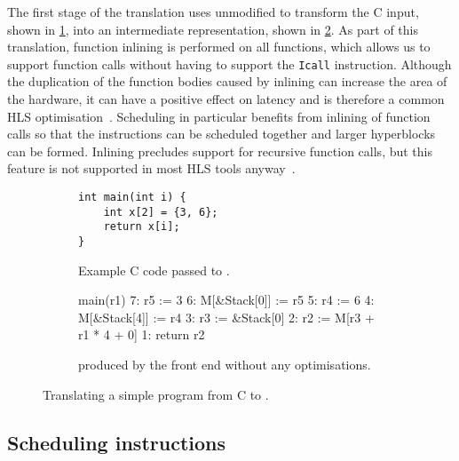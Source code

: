 The first stage of the translation uses unmodified \compcert{} to transform the
C input, shown in \cref{fig:accumulator_c}, into an \rtl{} intermediate
representation, shown in \cref{fig:accumulator_rtl}.  As part of this
translation, function inlining is performed on all functions, which allows us to
support function calls without having to support the \texttt{Icall} \rtl{}
instruction.  Although the duplication of the function bodies caused by inlining
can increase the area of the hardware, it can have a positive effect on latency
and is therefore a common HLS optimisation~\cite{noronha17_rapid_fpga}.
Scheduling in particular benefits from inlining of function calls so that the
instructions can be scheduled together and larger hyperblocks can be formed.
Inlining precludes support for recursive function calls, but this feature is not
supported in most HLS tools anyway~\cite{thomas16_srcht}.

\begin{figure}
  \centering
    \begin{subfigure}[b]{0.48\linewidth}
\begin{verbatim}
int main(int i) {
    int x[2] = {3, 6};
    return x[i];
}
\end{verbatim}
      \caption{Example C code passed to \vericert{}.}\label{fig:accumulator_c}
    \end{subfigure}\hfill%
    \begin{subfigure}[b]{0.48\linewidth}
\lstset{numbers=left,basicstyle=\footnotesize\ttfamily,numberstyle=\tiny,keepspaces=true,showspaces=true,xleftmargin=20pt}
\begin{rtllisting}
main(r1) {
  7: r5 := 3
  6: M[&Stack[0]] := r5
  5: r4 := 6
  4: M[&Stack[4]] := r4
  3: r3 := &Stack[0]
  2: r2 := M[r3 + r1 * 4 + 0]
  1: return r2
}
\end{rtllisting}
      \caption{\rtl{} produced by the \compcert{} front end without any optimisations.}\label{fig:accumulator_rtl}
    \end{subfigure}
    \caption{Translating a simple program from C to \rtl{}.}\label{fig:accumulator_c_rtl}
\end{figure}

\subsection{Scheduling \rtl{} instructions}

